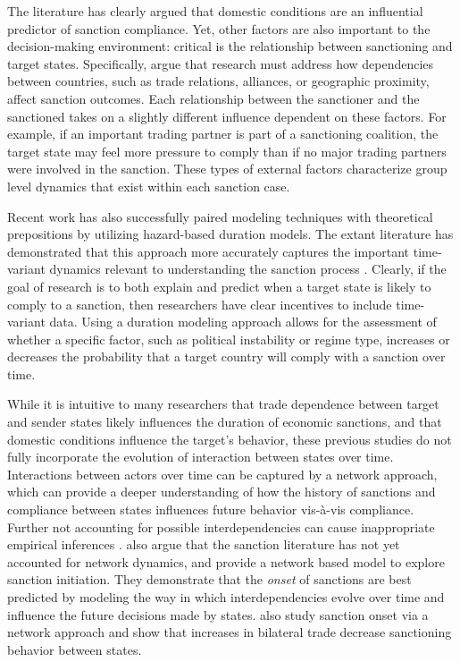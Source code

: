The literature has clearly argued that domestic conditions are an influential predictor of sanction compliance. Yet, other factors are also important to the decision-making environment: critical is the relationship between sanctioning and target states. Specifically, \cite{mclean2010friends} argue that research must address how dependencies between countries, such as trade relations, alliances, or geographic proximity, affect sanction outcomes. Each relationship between the sanctioner and the sanctioned takes on a slightly different influence dependent on these factors. For example, if an important trading partner is part of a sanctioning coalition, the target state may feel more pressure to comply than if no major trading partners were involved in the sanction. These types of external factors characterize group level dynamics that exist within each sanction case. 

Recent work has also successfully paired modeling techniques with theoretical prepositions by utilizing hazard-based duration models. The extant literature has demonstrated that this approach more accurately captures the important time-variant dynamics relevant to understanding the sanction process \citep{bolks2000}. Clearly, if the goal of research is to both explain and predict when a target state is likely to comply to a sanction, then researchers have clear incentives to include time-variant data. Using a duration modeling approach allows for the assessment of whether a specific factor, such as political instability or regime type, increases or decreases the probability that a target country will comply with a sanction over time.

While it is intuitive to many researchers that trade dependence between target and sender states likely influences the duration of economic sanctions, and that domestic conditions influence the target's behavior, these previous studies do not fully incorporate the evolution of interaction between states over time. Interactions between actors over time can be captured by a network approach, which can provide a deeper understanding of how the history of sanctions and compliance between states influences future behavior vis-\`a-vis compliance. Further not accounting for possible interdependencies can cause inappropriate empirical inferences \citep{erikson2014dyadic}. \citet{cranmer2014reciprocity} also argue that the sanction literature has not yet accounted for network dynamics, and provide a network based model to explore sanction initiation. They demonstrate that the \textit{onset} of sanctions are best predicted by modeling the way in which interdependencies evolve over time and influence the future decisions made by states. \citet{hafner2008} also study sanction onset via a network approach and show that increases in bilateral trade decrease sanctioning behavior between states.

